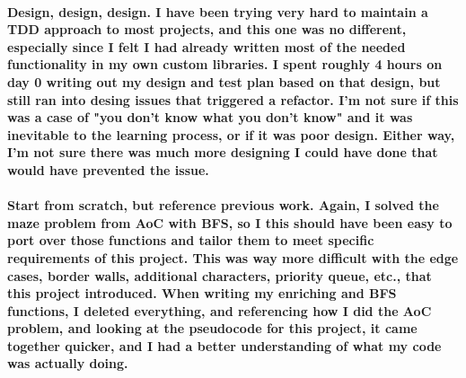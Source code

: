 \documentclass{report}
\begin{document}
\paragraph{Design, design, design. I have been trying very hard to maintain a TDD approach to most
projects, and this one was no different, especially since I felt I had already written most of the
needed functionality in my own custom libraries. I spent roughly 4 hours on day 0 writing out my
design and test plan based on that design, but still ran into desing issues that triggered a refactor.
I'm not sure if this was a case of "you don't know what you don't know" and it was inevitable to the
learning process, or if it was poor design. Either way, I'm not sure there was much more designing
I could have done that would have prevented the issue.}
\paragraph{Start from scratch, but reference previous work. Again, I solved the maze problem from AoC with BFS,
so I this should have been easy to port over those functions and tailor them to meet 
specific requirements of this project. This was way more difficult with the edge cases,
border walls, additional characters, priority queue, etc., that this project introduced.
When writing my enriching and BFS functions, I deleted everything, and referencing how I did the 
AoC problem, and looking at the pseudocode for this project, it came together quicker, and I had
a better understanding of what my code was actually doing.}
\end{document}
